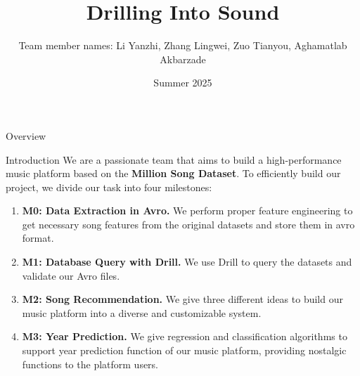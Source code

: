 \documentclass{beamer}
\title{Drilling Into Sound}
\author{Team member names: Li Yanzhi, Zhang Lingwei, Zuo Tianyou, Aghamatlab Akbarzade}
\date{Summer 2025}
\begin{document}
\maketitle


\begin{section}{Overview}
    \begin{frame}{Introduction}
        We are a passionate team that aims to build a high-performance music platform based on the \textbf{Million Song Dataset}. To efficiently build our project, we divide our task into four milestones:
        
        \begin{enumerate}
            \item \textbf{M0: Data Extraction in Avro.} We perform proper feature engineering to get necessary song features from the original datasets and store them in avro format.
            \item \textbf{M1: Database Query with Drill.} We use Drill to query the datasets and validate our Avro files.
            \item \textbf{M2: Song Recommendation.} We give three different ideas to build our music platform into a diverse and customizable system.
            \item \textbf{M3: Year Prediction.} We give regression and classification algorithms to support year prediction function of our music platform, providing nostalgic functions to the platform users.
        \end{enumerate}
    \end{frame}
\end{section}
\end{document}
